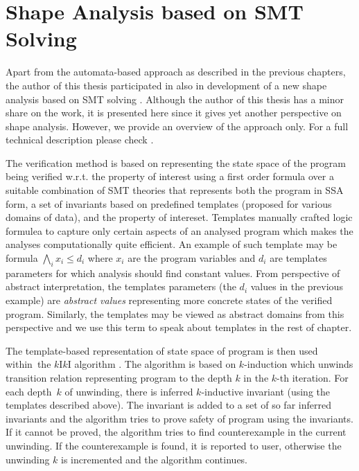 {\chapter{Shape Analysis based on SMT Solving}
\label{ch:fmcad}
Apart from the automata-based approach as described in the previous chapters, the author of this thesis participated
in also in development of a new shape analysis based on SMT solving \cite{fmcad18}.
Although the author of this thesis has a minor share on the work, it is presented
here since it gives yet another perspective on shape analysis.
However, we provide an overview of the approach only. For a full technical description please check \cite{fmcad18}.

The verification method is based on representing the state space of the program being verified w.r.t. the property of interest
using a first order formula over a suitable combination of SMT theories that represents both the program in SSA form, a set of
invariants based on predefined templates (proposed for various domains of data), and the property of intereset.
Templates manually crafted logic formulea to capture only certain aspects of an analysed program
which makes the analyses computationally quite efficient.
An example of such template may be formula $\bigwedge_{i} x_i \leq d_i$ where $x_i$ are the program
variables and $d_i$ are templates parameters for which analysis should find constant values.
From perspective of abstract interpretation, the templates parameters (the $d_i$ values in the previous example)
are \emph{abstract values} representing more concrete states of the verified program.
Similarly, the templates may be viewed as abstract domains from this perspective 
and we use this term to speak about templates in the rest of chapter.

The template-based representation of state space of program is then used within~the $k$I$k$I algorithm \cite{kiki}.
The algorithm is based on $k$-induction \cite{kind} which unwinds transition relation representing program to the depth $k$
in the $k$-th iteration.
For each depth~$k$ of unwinding, there is inferred $k$-inductive invariant (using the templates described above).
The invariant is added to a set of so far inferred invariants and the algorithm
tries to prove safety of program using the invariants.
If it cannot be proved, the algorithm tries to find counterexample in the current unwinding.
If the counterexample is found, it is reported to user, otherwise the unwinding $k$ is incremented and
the algorithm continues.

}
